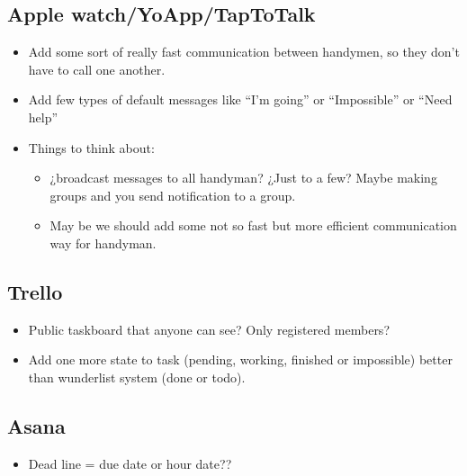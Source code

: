 \subsection{Apple watch/YoApp/TapToTalk}

\begin{itemize}
\item Add some sort of really fast communication between handymen, so they don't have to call one another.
\item Add few types of default messages like “I'm going” or “Impossible” or “Need help”
\item Things to think about:
\begin{itemize}\label{AppleWatch}
\item ¿broadcast messages to all handyman? ¿Just to a few? Maybe making groups and you send notification to a group.
\item May be we should add some not so fast but more efficient communication way for handyman.
\end{itemize}
\end{itemize}

\subsection{Trello}

\begin{itemize}
\item Public taskboard that anyone can see? Only registered members?
\item Add one more state to task (pending, working, finished or impossible) better than wunderlist system (done or todo).
\end{itemize}

\subsection{Asana}
\begin{itemize}
 	\item  Dead line = due date or hour date??
\end{itemize}

